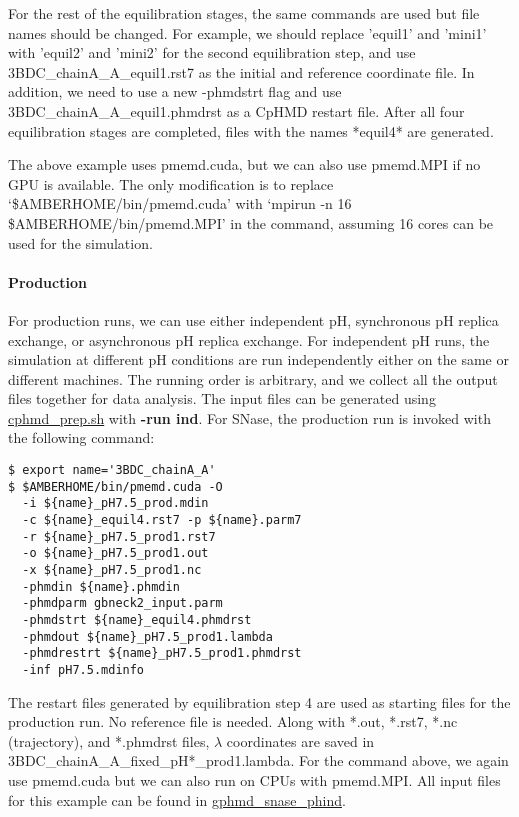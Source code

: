 For the rest of the equilibration stages, 
the same commands are used
but file names should be changed. For example, we should replace 'equil1' and 'mini1' with 'equil2' and 'mini2' for the second equilibration step, and use 3BDC\_chainA\_A\_equil1.rst7 as the initial and reference coordinate file. 
In addition, we need to use a new -phmdstrt flag and use 3BDC\_chainA\_A\_equil1.phmdrst as a CpHMD restart file. 
After all four equilibration stages are completed,
files with the names *equil4* are generated.

The above example uses pmemd.cuda, but we can also use pmemd.MPI if no GPU is available. The only modification is to replace
`\$AMBERHOME/bin/pmemd.cuda' with `mpirun -n 16 \$AMBERHOME/bin/pmemd.MPI' in the command, assuming 16 cores can be used for the simulation.



\paragraph{Production}
For production runs, we can use either independent pH, 
synchronous pH replica exchange, or asynchronous pH replica exchange.
For independent pH runs, the simulation at different pH 
conditions are run independently either on the same or different machines. 
The running order is arbitrary, and we collect all the output files together for data analysis. 
The input files can be generated using 
\href{https://gitlab.com/shenlab-amber-cphmd/cphmd-prep/-/tree/master/cphmd_tools/cphmd_prep.sh}{cphmd\_prep.sh}
with \textbf{-run ind}.
For SNase, the production run 
is invoked with the following command:
\begin{lstlisting}
$ export name='3BDC_chainA_A'
$ $AMBERHOME/bin/pmemd.cuda -O
  -i ${name}_pH7.5_prod.mdin
  -c ${name}_equil4.rst7 -p ${name}.parm7
  -r ${name}_pH7.5_prod1.rst7
  -o ${name}_pH7.5_prod1.out
  -x ${name}_pH7.5_prod1.nc
  -phmdin ${name}.phmdin
  -phmdparm gbneck2_input.parm
  -phmdstrt ${name}_equil4.phmdrst
  -phmdout ${name}_pH7.5_prod1.lambda
  -phmdrestrt ${name}_pH7.5_prod1.phmdrst
  -inf pH7.5.mdinfo
\end{lstlisting}
The restart files generated by equilibration step 4 are used as starting files for the production run. No reference file is needed. 
Along with *.out, *.rst7, *.nc (trajectory), 
and *.phmdrst files, 
$\lambda$ coordinates are saved in 3BDC\_chainA\_A\_fixed\_pH*\_prod1.lambda. 
For the command above, we again use pmemd.cuda
but we can also run on CPUs with pmemd.MPI.
All input files for this example can be found in \href{https://gitlab.com/shenlab-amber-cphmd/cphmd-tutorial/-/tree/main/gphmd_Amber/gphmd_snase_phind}{gphmd\_snase\_phind}.

